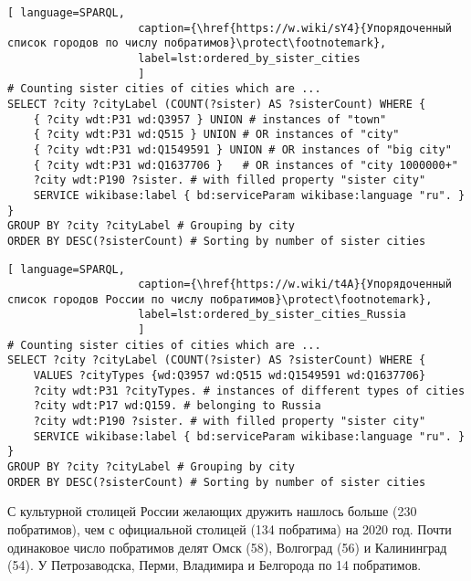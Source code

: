 \begin{lstlisting}[ language=SPARQL, 
                    caption={\href{https://w.wiki/sY4}{Упорядоченный список городов по числу побратимов}\protect\footnotemark},
                    label=lst:ordered_by_sister_cities
                    ]
# Counting sister cities of cities which are ...
SELECT ?city ?cityLabel (COUNT(?sister) AS ?sisterCount) WHERE {           
	{ ?city wdt:P31 wd:Q3957 } UNION # instances of "town"
	{ ?city wdt:P31 wd:Q515 } UNION # OR instances of "city"
	{ ?city wdt:P31 wd:Q1549591 } UNION # OR instances of "big city"
	{ ?city wdt:P31 wd:Q1637706 }	# OR instances of "city 1000000+"
	?city wdt:P190 ?sister. # with filled property "sister city"
	SERVICE wikibase:label { bd:serviceParam wikibase:language "ru". }
}
GROUP BY ?city ?cityLabel # Grouping by city                                   
ORDER BY DESC(?sisterCount) # Sorting by number of sister cities
\end{lstlisting}

\begin{lstlisting}[ language=SPARQL, 
                    caption={\href{https://w.wiki/t4A}{Упорядоченный список городов России по числу побратимов}\protect\footnotemark},
                    label=lst:ordered_by_sister_cities_Russia
                    ]
# Counting sister cities of cities which are ...
SELECT ?city ?cityLabel (COUNT(?sister) AS ?sisterCount) WHERE {           
	VALUES ?cityTypes {wd:Q3957 wd:Q515 wd:Q1549591 wd:Q1637706}
	?city wdt:P31 ?cityTypes. # instances of different types of cities
	?city wdt:P17 wd:Q159. # belonging to Russia
	?city wdt:P190 ?sister. # with filled property "sister city"
	SERVICE wikibase:label { bd:serviceParam wikibase:language "ru". }
}
GROUP BY ?city ?cityLabel # Grouping by city
ORDER BY DESC(?sisterCount) # Sorting by number of sister cities
\end{lstlisting}

С культурной столицей России желающих дружить нашлось больше (230 побратимов), чем с официальной столицей (134 побратима) на 2020 год. Почти одинаковое число побратимов делят Омск (58), Волгоград (56) и Калининград (54). У Петрозаводска, Перми, Владимира и Белгорода по 14 побратимов.




